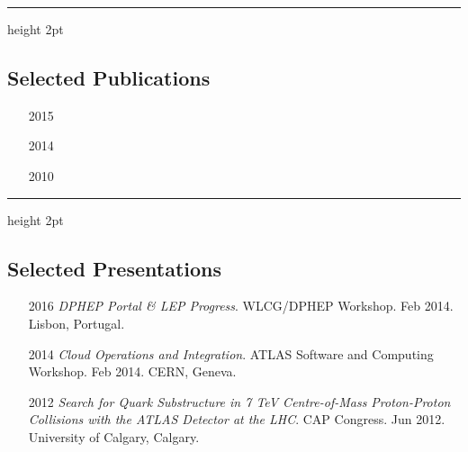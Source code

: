 \documentclass[12pt,a4paper]{article}
\newcommand{\colorrule}[1]
{
  {\color{#1}\hrule height 2pt}
  \vspace{1.0em}
}
\begin{document}
\colorrule{NavyBlue}
\subsection*{Selected Publications}
%

\begin{itemize}
	\item[2015] 
	\item[2014] 
	\item[2010] 
\end{itemize}


\colorrule{NavyBlue}
\subsection*{Selected Presentations}
\begin{itemize}
	\item[2016] \emph{DPHEP Portal \& LEP Progress}. WLCG/DPHEP Workshop.  Feb
		2014. Lisbon, Portugal.
	\item[2014] \emph{Cloud Operations and Integration}. ATLAS Software and
		Computing Workshop. Feb 2014. CERN, Geneva.
	\item[2012] \emph{Search for Quark Substructure in 7 TeV Centre-of-Mass
		Proton-Proton Collisions with the ATLAS Detector at the LHC}. CAP Congress.
		Jun 2012. University of Calgary, Calgary.
\end{itemize}
\end{document}

